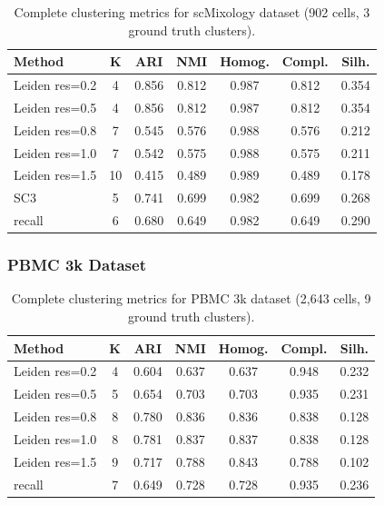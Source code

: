 \begin{table}[htbp]
\centering
\caption{Complete clustering metrics for scMixology dataset (902 cells, 3 ground truth clusters).}
\label{tab:scmixology_full}
\small
\begin{tabular}{@{}lcccccc@{}}
\toprule
\textbf{Method} & \textbf{K} & \textbf{ARI} & \textbf{NMI} & \textbf{Homog.} & \textbf{Compl.} & \textbf{Silh.} \\
\midrule
Leiden res=0.2 & 4 & 0.856 & 0.812 & 0.987 & 0.812 & 0.354 \\
Leiden res=0.5 & 4 & 0.856 & 0.812 & 0.987 & 0.812 & 0.354 \\
Leiden res=0.8 & 7 & 0.545 & 0.576 & 0.988 & 0.576 & 0.212 \\
Leiden res=1.0 & 7 & 0.542 & 0.575 & 0.988 & 0.575 & 0.211 \\
Leiden res=1.5 & 10 & 0.415 & 0.489 & 0.989 & 0.489 & 0.178 \\
SC3 & 5 & 0.741 & 0.699 & 0.982 & 0.699 & 0.268 \\
recall & 6 & 0.680 & 0.649 & 0.982 & 0.649 & 0.290 \\
\bottomrule
\end{tabular}
\end{table}

\subsubsection{PBMC 3k Dataset}

\begin{table}[htbp]
\centering
\caption{Complete clustering metrics for PBMC 3k dataset (2,643 cells, 9 ground truth clusters).}
\label{tab:pbmc3k_full}
\small
\begin{tabular}{@{}lcccccc@{}}
\toprule
\textbf{Method} & \textbf{K} & \textbf{ARI} & \textbf{NMI} & \textbf{Homog.} & \textbf{Compl.} & \textbf{Silh.} \\
\midrule
Leiden res=0.2 & 4 & 0.604 & 0.637 & 0.637 & 0.948 & 0.232 \\
Leiden res=0.5 & 5 & 0.654 & 0.703 & 0.703 & 0.935 & 0.231 \\
Leiden res=0.8 & 8 & 0.780 & 0.836 & 0.836 & 0.838 & 0.128 \\
Leiden res=1.0 & 8 & 0.781 & 0.837 & 0.837 & 0.838 & 0.128 \\
Leiden res=1.5 & 9 & 0.717 & 0.788 & 0.843 & 0.788 & 0.102 \\
recall & 7 & 0.649 & 0.728 & 0.728 & 0.935 & 0.236 \\
\bottomrule
\end{tabular}
\end{table}

